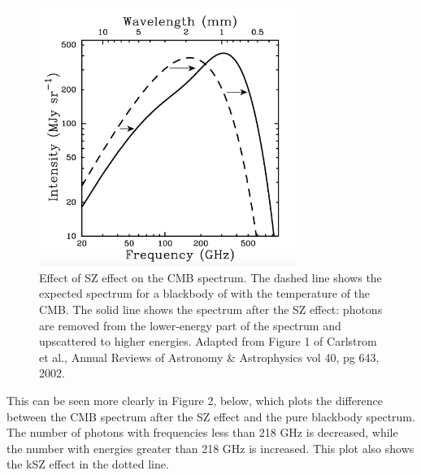 \documentclass{article}
\begin{document}
\begin{figure}
    \centering
    \includegraphics[width=0.75\textwidth]{CarlstromFig1.png}
    \caption{Effect of SZ effect on the CMB spectrum. The dashed line shows the expected spectrum for a blackbody of with the temperature of the CMB. The solid line shows the spectrum after the SZ effect: photons are removed from the lower-energy part of the spectrum and upscattered to higher energies. Adapted from Figure 1 of Carlstrom et al., Annual Reviews of Astronomy \& Astrophysics vol 40, pg 643, 2002.}
    \label{fig:carlstrom1}
\end{figure}

This can be seen more clearly in Figure 2, below, which plots the difference between the CMB spectrum after the SZ effect and the pure blackbody spectrum. The number of photons with frequencies less than 218 GHz is decreased, while the number with energies greater than 218 GHz is increased. This plot also shows the kSZ effect in the dotted line.
\end{document}
